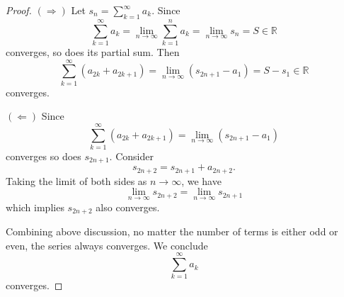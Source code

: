 \begin{Exercise}
\begin{proof}
$(\Longrightarrow)$
Let $s_n = \sum_{k=1}^{\infty}a_k$. Since $$\sum_{k=1}^{\infty}a_k = \lim_{n\to\infty}\sum_{k=1}^{n}a_k = \lim_{n\to\infty}s_n = S \in \mathbb{R}$$
converges, so does its partial sum. Then $$\sum_{k=1}^{\infty}(a_{2k}+a_{2k+1}) = \lim_{n\to\infty}(s_{2n+1}-a_1) = S-s_1 \in \mathbb{R}$$ converges. 

\vspace{2ex}

$(\Longleftarrow)$ Since  $$\sum_{k=1}^{\infty}(a_{2k}+a_{2k+1}) = \lim_{n\to\infty}(s_{2n+1}-a_1)$$ converges so does $s_{2n+1}$. Consider $$s_{2n+2} = s_{2n+1}+a_{2n+2}.$$
Taking the limit of both sides as $n\to\infty$, we have $$\lim_{n\to\infty}s_{2n+2} = \lim_{n\to\infty}s_{2n+1}$$
which implies $s_{2n+2}$ also converges.

\vspace{1ex}

Combining above discussion, no matter the number of terms is either odd or even, the series always converges. We conclude $$ \sum_{k=1}^{\infty}a_k$$ converges.
\end{proof}
\end{Exercise}